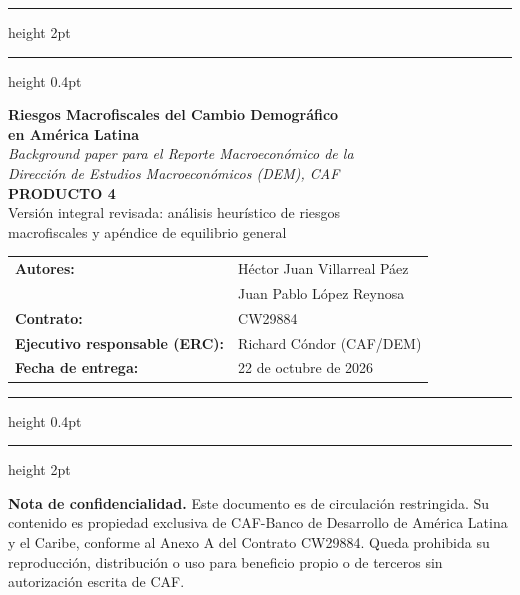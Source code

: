 \documentclass[12pt, letterpaper]{article}
\begin{document}
\thispagestyle{empty}

\vspace*{1cm}

{\color{cafblue}\hrule height 2pt}
\vspace{0.4cm}
{\color{cafblue}\hrule height 0.4pt}
\vspace{0.8cm}

\begin{center}
  {\Large\bfseries\color{cafblue}
    Riesgos Macrofiscales del Cambio Demográfico\\[6pt]
    en América Latina}\\[1cm]

  {\large\itshape
    \textit{Background paper} para el Reporte Macroeconómico de la\\
    Dirección de Estudios Macroeconómicos (DEM), CAF}\\[1.5cm]

  {\normalsize\bfseries PRODUCTO 4}\\[0.3cm]
  {\normalsize Versión integral revisada: análisis heurístico de riesgos\\
   macrofiscales y apéndice de equilibrio general}\\[1.5cm]

  \begin{tabular}{ll}
    \textbf{Autores:}            & Héctor Juan Villarreal Páez \\[4pt]
                                 & Juan Pablo López Reynosa \\[4pt]
    \textbf{Contrato:}           & CW29884 \\[4pt]
    \textbf{Ejecutivo responsable (ERC):} & Richard Cóndor (CAF/DEM) \\[4pt]
    \textbf{Fecha de entrega:}   & 22 de octubre de 2026 \\
  \end{tabular}
\end{center}

\vspace{1.5cm}
{\color{cafblue}\hrule height 0.4pt}
\vspace{0.4cm}
{\color{cafblue}\hrule height 2pt}

\vspace{2cm}

\begin{small}
\noindent\textbf{Nota de confidencialidad.}
Este documento es de circulación restringida. Su contenido es propiedad exclusiva
de CAF-Banco de Desarrollo de América Latina y el Caribe, conforme al Anexo A del
Contrato CW29884. Queda prohibida su reproducción, distribución o uso para
beneficio propio o de terceros sin autorización escrita de CAF.
\end{small}
\end{document}
